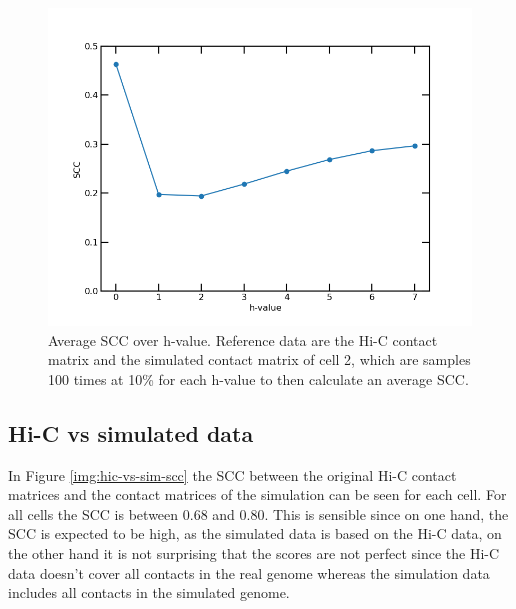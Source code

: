 \documentclass[10pt,abstract=true,titlepage=false,toc=bib]{scrartcl}
\begin{document}
\begin{figure}[ht]
\centering
	\includegraphics[width=14cm]{h_train.png}
	\caption{Average SCC over h-value. Reference data are the Hi-C contact matrix and the simulated contact matrix of cell 2, which are samples 100 times at 10\% for each h-value to then calculate an average SCC.}
	\label{img:h_train}
\end{figure}


\subsection{Hi-C vs simulated data} %
\label{sub:hi_c_vs_simulated_data}

In Figure \ref{img:hic-vs-sim-scc} the SCC between the original Hi-C contact matrices and the contact matrices of the simulation can be seen for each cell. For all cells the SCC is between \(0.68\) and \(0.80\). This is sensible since on one hand, the SCC is expected to be high, as the simulated data is based on the Hi-C data, on the other hand it is not surprising that the scores are not perfect since the Hi-C data doesn't cover all contacts in the real genome whereas the simulation data includes all contacts in the simulated genome.
\end{document}
